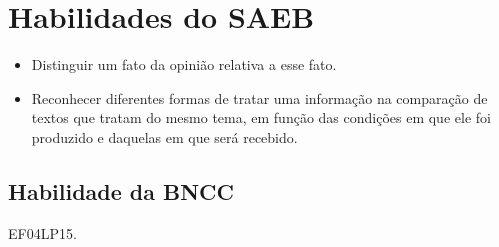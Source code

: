 \section*{Habilidades do SAEB}

\begin{itemize}
  \item Distinguir um fato da opinião relativa a esse fato.

  \item Reconhecer diferentes formas de tratar uma informação na comparação 
  de textos que tratam do mesmo tema, em função das condições em que ele foi
  produzido e daquelas em que será recebido.
\end{itemize}

\subsection{Habilidade da BNCC}
EF04LP15.



